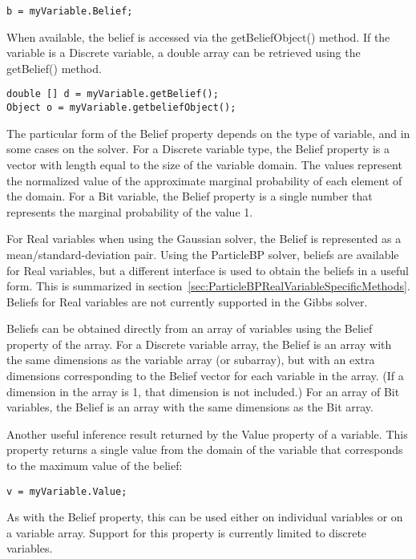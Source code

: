 \begin{lstlisting}
b = myVariable.Belief;
\end{lstlisting}
\fi

\ifjava

When available, the belief is accessed via the getBeliefObject() method.  If the variable is a Discrete variable, a double array can be retrieved using the getBelief() method.

\begin{lstlisting}
double [] d = myVariable.getBelief();
Object o = myVariable.getbeliefObject();
\end{lstlisting}
\fi

The particular form of the Belief property depends on the type of variable, and in some cases on the solver.  For a Discrete variable type, the Belief property is a vector with length equal to the size of the variable domain.  The values represent the normalized value of the approximate marginal probability of each element of the domain.  For a Bit variable, the Belief property is a single number that represents the marginal probability of the value 1.

For Real variables when using the Gaussian solver, the Belief is represented as a mean/standard-deviation pair.  Using the ParticleBP solver, beliefs are available for Real variables, but a different interface is used to obtain the beliefs in a useful form.  This is summarized in section~\ref{sec:ParticleBPRealVariableSpecificMethods}.  Beliefs for Real variables are not currently supported in the Gibbs solver.

Beliefs can be obtained directly from an array of variables using the Belief property of the array.  For a Discrete variable array, the Belief is an array with the same dimensions as the variable array (or subarray), but with an extra dimensions corresponding to the Belief vector for each variable in the array.  (If a dimension in the array is 1, that dimension is not included.)  For an array of Bit variables, the Belief is an array with the same dimensions as the Bit array.

Another useful inference result returned by the Value property of a variable.  This property returns a single value from the domain of the variable that corresponds to the maximum value of the belief:

\ifmatlab
\begin{lstlisting}
v = myVariable.Value;
\end{lstlisting}

As with the Belief property, this can be used either on individual variables or on a variable array.  Support for this property is currently limited to discrete variables.

